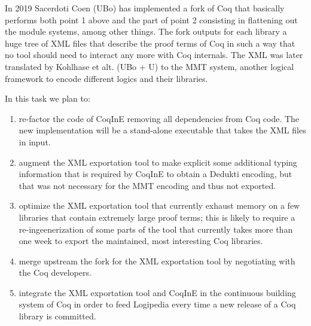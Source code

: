 In 2019 Sacerdoti Coen (UBo) has implemented a fork of Coq that basically performs both point 1 above and the part of point 2 consisting in flattening out the module systems, among other things. The fork outputs for each library a huge tree of XML files that describe the proof terms of Coq in such a way that no tool should need to interact any more with Coq internals. The XML was later translated by Kohlhase et alt. (UBo + U) to the MMT system, another logical framework to encode different logics and their libraries.

In this task we plan to:
\begin{enumerate}
 \item re-factor the code of CoqInE removing all dependencies from Coq code. The new implementation will be a stand-alone executable that takes the XML files in input.
 \item augment the XML exportation tool to make explicit some additional typing information that is required by CoqInE to obtain a Dedukti encoding, but that was not necessary for the MMT encoding and thus not exported.
 \item optimize the XML exportation tool that currently exhaust memory on a few libraries that contain extremely large proof terms; this is likely to require a re-ingeenerization of some parts of the tool that currently takes more than one week to export the maintained, most interesting Coq libraries.
 \item merge upstream the fork for the XML exportation tool by negotiating with the Coq developers.
 \item integrate the XML exportation tool and CoqInE in the continuous building system of Coq in order to feed Logipedia every time a new release of a Coq library is committed.
\end{enumerate}


